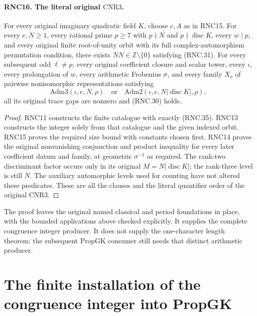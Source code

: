 \documentclass[11pt,a4paper]{article}
\numberwithin{equation}{section}
\theoremstyle{remark}\newtheorem{remark}[theorem]{Remark}
\begin{document}
\paragraph{RNC16. The literal original $\mathrm{CNR3}$.}
\label{claim:RNC16}
For every original imaginary quadratic field $K$, choose
$c,A$ as in RNC15.  For every $e,N\geq1$, every rational
prime $p\geq7$ with $p\nmid N$ and
$p\nmid\operatorname{disc}K$, every $w\mid p$, and
every original finite root-of-unity orbit with its
full complex-automorphism permutation condition, there
exists $NN\in\mathbb Z\setminus\{0\}$ satisfying
(RNC.31).  For every subsequent odd $\ell\ne p$,
every original coefficient closure and scalar tower,
every $\iota$, every prolongation of $w$, every
arithmetic Frobenius $\sigma$, and every family
$X_o$ of pairwise nonisomorphic representations satisfying
\[
 \mathrm{Adm3}(\iota,e,N,\rho)
          \quad\text{or}\quad
 \mathrm{Adm2}(\iota,e,N|\operatorname{disc}K|,\rho),
                                                               \tag{RNC.35}
\]
all its original trace gaps are nonzero and (RNC.30) holds.
\begin{proof}
RNC11 constructs the finite catalogue with exactly
(RNC.35).  RNC13 constructs the integer solely from that
catalogue and the given indexed orbit.  RNC15 proves the
required size bound with constants chosen first.
RNC14 proves the original nonvanishing conjunction and
product inequality for every later coefficient datum
and family, at geometric $\sigma^{-1}$ as required.
The rank-two discriminant factor occurs only in its
original $M=N|\operatorname{disc}K|$; the rank-three
level is still $N$.  The auxiliary automorphic levels
used for counting have not altered these predicates.
These are all the clauses and the literal quantifier
order of the original $\mathrm{CNR3}$.
\end{proof}

The proof leaves the original named classical and period
foundations in place, with the bounded applications above
checked explicitly.  It supplies the complete congruence
integer producer.  It does not supply the one-character
length theorem: the subsequent $\mathrm{PropGK}$ consumer
still needs that distinct arithmetic producer.


\section{The finite installation of the congruence integer into PropGK}
\label{sec:prop-gk-installation-v046}
\end{document}
